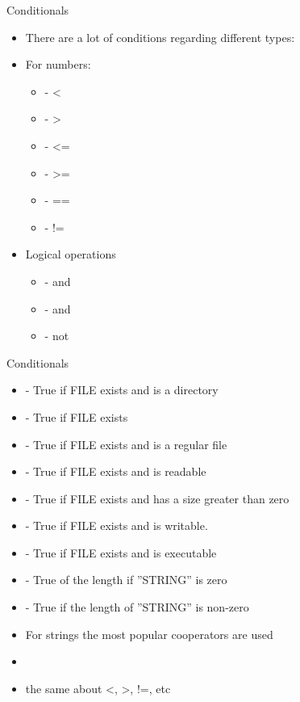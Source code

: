 \documentclass[usenames,dvipsnames,10pt,aspectratio=169]{beamer}
\begin{document}
\begin{frame}{Conditionals}
    \begin{itemize}
        \item There are a lot of conditions regarding different types:
        \item For numbers:
        \begin{itemize}
            \item {} - <
            \item {} - >
            \item {} - <=
            \item {} - >=
            \item {} - ==
            \item {} - !=
        \end{itemize}
        \item Logical operations
        \begin{itemize}
            \item {} - and
            \item {} - and
            \item \ex{!} - not
        \end{itemize}
    \end{itemize}
\end{frame}

\begin{frame}{Conditionals}
    \begin{itemize}
        \item \ex{[-d FILE]} - True if FILE exists and is a directory
        \item \ex{[-e FILE]} - True if FILE exists
        \item \ex{[-f FILE]} - True if FILE exists and is a regular file
        \item \ex{[-r FILE]} - True if FILE exists and is readable
        \item \ex{[-s FILE]} -  True if FILE exists and has a size greater than zero
        \item \ex{[-w FILE]} - True if FILE exists and is writable.
        \item \ex{[-x FILE]} -  True if FILE exists and is executable
        \item \ex{[-z STRING]} - True of the length if ”STRING” is zero
        \item \ex{[-n STRING]} - True if the length of ”STRING” is non-zero
        \item For strings the most popular cooperators are used
        \item \ex{[[ ]STRING1 == STRING2 ]]} 
        \item the same about <, >, !=, etc
    \end{itemize}
\end{frame}
\end{document}

